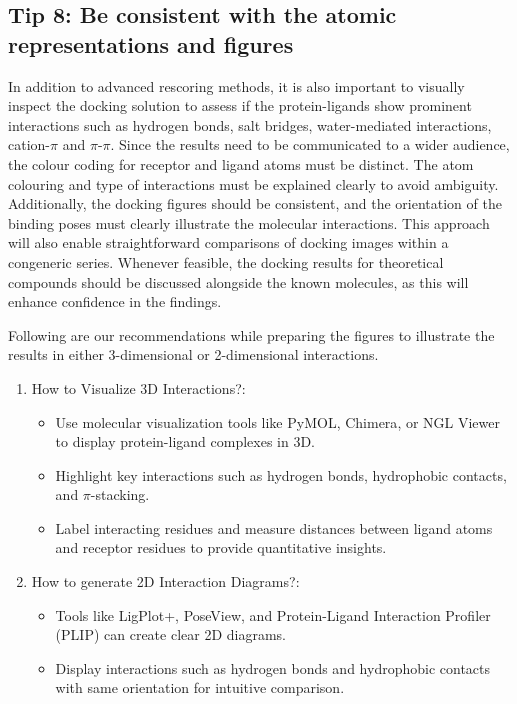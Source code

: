 \documentclass[10pt,letterpaper]{article}
\begin{document}
{{\subsection*{Tip 8: Be consistent with the atomic representations and figures}
In addition to advanced rescoring methods, it is also important to visually inspect the docking solution to assess if the protein-ligands show prominent interactions such as hydrogen bonds, salt bridges, water-mediated interactions, cation-$\pi$ and $\pi$-$\pi$. Since the results need to be communicated to a wider audience, the colour coding for receptor and ligand atoms must be distinct. The atom colouring and type of interactions must be explained clearly to avoid ambiguity. Additionally, the docking figures should be consistent, and the orientation of the binding poses must clearly illustrate the molecular interactions. This approach will also enable straightforward comparisons of docking images within a congeneric series. Whenever feasible, the docking results for theoretical compounds should be discussed alongside the known molecules, as this will enhance confidence in the findings.

Following are our recommendations while preparing the figures to illustrate the results in either 3-dimensional or 2-dimensional interactions. 
\begin{enumerate}
    \item How to Visualize 3D Interactions?:
    \begin{itemize}
	       \item Use molecular visualization tools like PyMOL\cite{bib65}, Chimera\cite{bib66}, or NGL Viewer\cite{bib67} to display protein-ligand complexes in 3D. 
           \item Highlight key interactions such as hydrogen bonds, hydrophobic contacts, and $\pi$-stacking.
	       \item Label interacting residues and measure distances between ligand atoms and receptor residues to provide quantitative insights.
    \end{itemize}
    \item How to generate 2D Interaction Diagrams?:
        \begin{itemize}
            \item Tools like LigPlot+\cite{bib68}, PoseView\cite{bib69}, and Protein-Ligand Interaction Profiler (PLIP)\cite{bib70} can create clear 2D diagrams. 
            \item Display interactions such as hydrogen bonds and hydrophobic contacts with same orientation for intuitive comparison. 
        \end{itemize}    
\end{enumerate}    


}}
\end{document}

